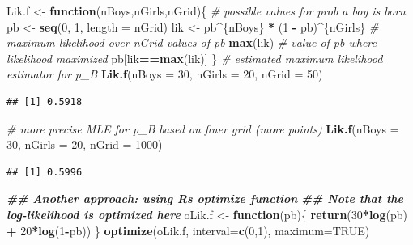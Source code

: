 \documentclass[
]{krantz}
\newenvironment{Shaded}{\begin{snugshade}}{\end{snugshade}}
\newcommand{\AttributeTok}[1]{\textcolor[rgb]{0.27,0.27,0.27}{#1}}
\newcommand{\CommentTok}[1]{\textcolor[rgb]{0.37,0.37,0.37}{\textit{#1}}}
\newcommand{\ConstantTok}[1]{\textcolor[rgb]{0.37,0.37,0.37}{#1}}
\newcommand{\ControlFlowTok}[1]{\textcolor[rgb]{0.27,0.27,0.27}{\textbf{#1}}}
\newcommand{\DecValTok}[1]{\textcolor[rgb]{0.06,0.06,0.06}{#1}}
\newcommand{\DocumentationTok}[1]{\textcolor[rgb]{0.37,0.37,0.37}{\textbf{\textit{#1}}}}
\newcommand{\FunctionTok}[1]{\textcolor[rgb]{0.27,0.27,0.27}{\textbf{#1}}}
\newcommand{\NormalTok}[1]{#1}
\newcommand{\OtherTok}[1]{\textcolor[rgb]{0.37,0.37,0.37}{#1}}
\newcommand{\SpecialCharTok}[1]{\textcolor[rgb]{0.43,0.43,0.43}{\textbf{#1}}}
\begin{document}
\begin{Shaded}
\begin{Highlighting}[]
\NormalTok{Lik.f }\OtherTok{\textless{}{-}} \ControlFlowTok{function}\NormalTok{(nBoys,nGirls,nGrid)\{}
    \CommentTok{\# possible values for prob a boy is born}
\NormalTok{    pb }\OtherTok{\textless{}{-}} \FunctionTok{seq}\NormalTok{(}\DecValTok{0}\NormalTok{, }\DecValTok{1}\NormalTok{, }\AttributeTok{length =}\NormalTok{ nGrid)   }
\NormalTok{    lik }\OtherTok{\textless{}{-}}\NormalTok{ pb}\SpecialCharTok{\^{}}\NormalTok{\{nBoys\} }\SpecialCharTok{*}\NormalTok{ (}\DecValTok{1} \SpecialCharTok{{-}}\NormalTok{ pb)}\SpecialCharTok{\^{}}\NormalTok{\{nGirls\}}
    \CommentTok{\# maximum likelihood over nGrid values of pb}
    \FunctionTok{max}\NormalTok{(lik)             }
    \CommentTok{\# value of pb where likelihood maximized}
\NormalTok{    pb[lik}\SpecialCharTok{==}\FunctionTok{max}\NormalTok{(lik)]    }
\NormalTok{  \}}
\CommentTok{\# estimated maximum likelihood estimator for p\_B}
\FunctionTok{Lik.f}\NormalTok{(}\AttributeTok{nBoys =} \DecValTok{30}\NormalTok{, }\AttributeTok{nGirls =} \DecValTok{20}\NormalTok{, }\AttributeTok{nGrid =} \DecValTok{50}\NormalTok{) }
\end{Highlighting}
\end{Shaded}

\begin{verbatim}
## [1] 0.5918
\end{verbatim}

\begin{Shaded}
\begin{Highlighting}[]
\CommentTok{\# more precise MLE for p\_B based on finer grid (more points)}
\FunctionTok{Lik.f}\NormalTok{(}\AttributeTok{nBoys =} \DecValTok{30}\NormalTok{, }\AttributeTok{nGirls =} \DecValTok{20}\NormalTok{, }\AttributeTok{nGrid =} \DecValTok{1000}\NormalTok{)}
\end{Highlighting}
\end{Shaded}

\begin{verbatim}
## [1] 0.5996
\end{verbatim}

\begin{Shaded}
\begin{Highlighting}[]
\DocumentationTok{\#\# Another approach: using R\textquotesingle{}s optimize function}
\DocumentationTok{\#\#   Note that the log{-}likelihood is optimized here}
\NormalTok{oLik.f }\OtherTok{\textless{}{-}} \ControlFlowTok{function}\NormalTok{(pb)\{}
    \FunctionTok{return}\NormalTok{(}\DecValTok{30}\SpecialCharTok{*}\FunctionTok{log}\NormalTok{(pb) }\SpecialCharTok{+} \DecValTok{20}\SpecialCharTok{*}\FunctionTok{log}\NormalTok{(}\DecValTok{1}\SpecialCharTok{{-}}\NormalTok{pb))}
\NormalTok{  \}}
\FunctionTok{optimize}\NormalTok{(oLik.f, }\AttributeTok{interval=}\FunctionTok{c}\NormalTok{(}\DecValTok{0}\NormalTok{,}\DecValTok{1}\NormalTok{), }\AttributeTok{maximum=}\ConstantTok{TRUE}\NormalTok{)}
\end{Highlighting}
\end{Shaded}
\end{document}
